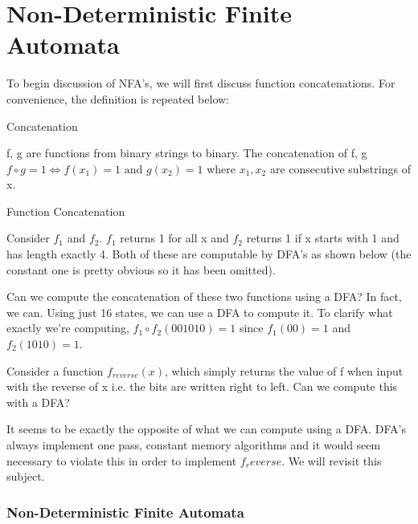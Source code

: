 \chapter{Non-Deterministic Finite Automata}

To begin discussion of NFA's, we will first discuss function concatenations. For convenience, the definition is repeated below:

\begin{definition}
    Concatenation

    f, g are functions from binary strings to binary. The concatenation of f, g $f \circ g = 1 \iff f(x_1) = 1 \text{ and } g(x_2) = 1$ where $x_1, x_2$ are consecutive substrings of x.
\end{definition}

\begin{example}
    Function Concatenation

    Consider $f_1$ and $f_2$. $f_1$ returns 1 for all x and $f_2$ returns 1 if x starts with 1 and has length exactly 4. Both of these are computable by DFA's as shown below (the constant one is pretty obvious so it has been omitted). 

    \begin{center}
    \end{center}

    Can we compute the concatenation of these two functions using a DFA? In fact, we can. Using just 16 states, we can use a DFA to compute it. To clarify what exactly we're computing, $f_1 \circ f_2(001010) = 1$ since $f_1(00) = 1$ and $f_2(1010) = 1$.
\end{example}

\begin{example}
    
    Consider a function $f_{reverse}(x)$, which simply returns the value of f when input with the reverse of x i.e. the bits are written right to left. Can we compute this with a DFA? 

    It seems to be exactly the opposite of what we can compute using a DFA. DFA's always implement one pass, constant memory algorithms and it would seem necessary to violate this in order to implement $f_reverse$. We will revisit this subject. 
\end{example}

\subsection*{Non-Deterministic Finite Automata}
\begin{center}
\end{center}

